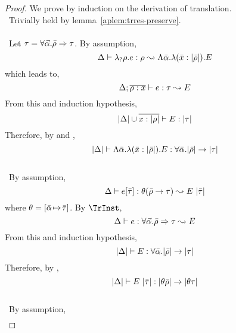 \begin{proof}
  We prove by induction on the derivation of translation.
  \\
  \case \TrQuery~Trivially held by lemma~\ref{aplem:trres-preserve}.
  \\
  \\
  \case \TrRule~Let $\tau = \forall \vec{\alpha}. \bar{\rho} \Rightarrow \tau$. By
  assumption,
  \begin{equation*}
    \Delta \vdash 
    \lambda_? \rho. e:\rho \leadsto
    \Lambda \bar{\alpha}. \lambda ({\bar{x}:|\bar{\rho}|}). E
  \end{equation*}
  which leads to,
  \begin{equation*}
    \Delta; \overline{\rho:x} \vdash 
    e:\tau \leadsto E
  \end{equation*}
  From this and induction hypothesis,
  \begin{equation*}
    |\Delta| \cup \overline{x:|\rho|} \vdash 
    E:|\tau|
  \end{equation*}
  Therefore, by \TyAbs{} and \TyTyAbs,
  \begin{equation*}
    |\Delta| \vdash \Lambda \bar{\alpha}. \lambda ({\bar{x}:|\bar{\rho}|}). E:\forall \bar{\alpha}.|\bar{\rho}| \to |\tau|
  \end{equation*}
  \\
  \case \TrInst~By assumption,
  \begin{equation*}
    \Delta \vdash e[\bar{\tau}]:\theta (\bar{\rho} \to
      \tau) \leadsto E~|\bar{\tau}|
  \end{equation*}
  where $\theta = [ \bar{\alpha}\!\mapsto\!\bar{\tau} ]$. By $\TrInst$,
  \begin{equation*}
    \Delta \vdash e:\forall \vec{\alpha}. \bar{\rho} \Rightarrow \tau
      \leadsto E
  \end{equation*}
  From this and induction hypothesis,
  \begin{equation*}
    |\Delta| \vdash E:\forall \bar{\alpha}. |\bar{\rho}| \to |\tau|
  \end{equation*}
  Therefore, by \TyTyApp,
  \begin{equation*}
    |\Delta| \vdash E~|\bar{\tau}|:|\theta \bar{\rho}| \to |\theta \tau|
  \end{equation*}
  \\
  \case \TrRApp~By assumption,
  \begin{align*}

\end{align*}
\end{proof}
